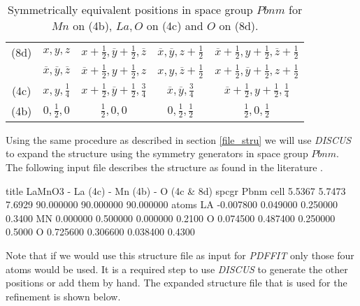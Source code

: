 \begin{table}[!htb]
\centering
\begin{tabular}{ccccc}
 (8d)& $x,y,z$
     & $x+\frac{1}{2},\overline{y}+\frac{1}{2},\overline{z}$
     & $\overline{x},\overline{y},z+\frac{1}{2}$
     & $\overline{x}+\frac{1}{2},y+\frac{1}{2},\overline{z}+\frac{1}{2}$
     \vspace{1mm} \\
     & $\overline{x},\overline{y},\overline{z}$
     & $\overline{x}+\frac{1}{2},y+\frac{1}{2},z$
     & $x,y,\overline{z}+\frac{1}{2}$
     & $x+\frac{1}{2},\overline{y}+\frac{1}{2},z+\frac{1}{2}$
     \vspace{2mm} \\
 (4c)& $x,y,\frac{1}{4}$
     & $x+\frac{1}{2},\overline{y}+\frac{1}{2},\frac{3}{4}$
     & $\overline{x},\overline{y},\frac{3}{4}$
     & $\overline{x}+\frac{1}{2},y+\frac{1}{2},\frac{1}{4}$
     \vspace{2mm} \\
 (4b)& $0,\frac{1}{2},0$
     & $\frac{1}{2},0,0$
     & $0,\frac{1}{2},\frac{1}{2}$
     & $\frac{1}{2},0,\frac{1}{2}$
\end{tabular}
\caption[Positions in space group $Pbnm$]
        {Symmetrically equivalent positions in space group $Pbnm$ for
         $Mn$ on (4b), $La,O$ on (4c) and $O$ on (8d).\label{exa_tab2}}
\end{table}

\noindent Using the same procedure as described in section
\ref{file_stru} we will use {\it DISCUS} to expand the structure
using the symmetry generators in space group $Pbnm$. The following
input file describes the structure as found in the literature
\citep{rohemo98}.

\footnotesize
\begin{MacVerbatim}
  title LaMnO3 - La (4c) - Mn (4b) - O (4c & 8d)
  spcgr Pbnm
  cell   5.5367   5.7473    7.6929   90.000000   90.000000   90.000000
  atoms
  LA         -0.007800        0.049000        0.250000     0.3400
  MN          0.000000        0.500000        0.000000     0.2100
  O           0.074500        0.487400        0.250000     0.5000
  O           0.725600        0.306600        0.038400     0.4300
\end{MacVerbatim}
\normalsize

\noindent Note that if we would use this structure file as input
for {\it PDFFIT} only those four atoms would be used. It is a
required step to use {\it DISCUS} to generate the other positions
or add them by hand. The expanded structure file that is used for
the refinement is shown below.

